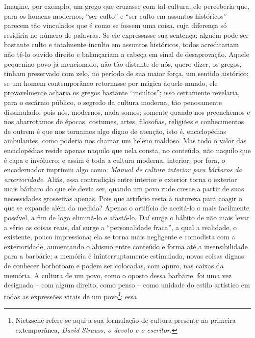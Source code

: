     Imagine, por exemplo, um grego que cruzasse com tal cultura; ele
    perceberia que, para os homens modernos, ``ser culto'' e ``ser culto
    em assuntos históricos'' parecem tão vinculados que é como se fossem
    uma coisa, cuja diferença só residiria no número de palavras. Se ele
    expressasse sua sentença: alguém pode ser bastante culto e
    totalmente inculto em assuntos históricos, todos acreditariam não
    tê-lo ouvido direito e balançariam a cabeça em sinal de
    desaprovação. Aquele pequenino povo já mencionado, não tão distante
    de nós, quero dizer, os gregos, tinham preservado com zelo, no
    período de sua maior força, um sentido aistórico; se um homem
    contemporâneo retornasse por mágica àquele mundo, ele provavelmente
    acharia os gregos bastante ``incultos''; isso certamente revelaria,
    para o escárnio público, o segredo da cultura moderna, tão
    penosamente dissimulado; pois nós, modernos, nada somos; somente
    quando nos preenchemos e nos abarrotamos de épocas, costumes, artes,
    filosofias, religiões e conhecimentos de outrem é que nos tornamos
    algo digno de atenção, isto é, enciclopédias ambulantes, como
    poderia nos chamar um heleno maldoso. Mas todo o valor das
    enciclopédias reside apenas naquilo que nela consta, no conteúdo,
    não naquilo que é capa e invólucro; e assim é toda a cultura
    moderna, interior; por fora, o encadernador imprimiu algo como:
    \emph{Manual de cultura interior para bárbaros da exterioridade}. Aliás,
    essa contradição entre interior e exterior torna o exterior mais
    bárbaro do que ele devia ser, quando um povo rude cresce a partir de
    suas necessidades grosseiras apenas. Pois que artifício resta à
    natureza para coagir o que se expande além da medida? Apenas o
    artifício de aceitá-lo o mais facilmente possível, a fim de logo
    eliminá-lo e afastá-lo. Daí surge o hábito de não mais levar a sério
    as coisas reais, daí surge a ``personalidade fraca'', a qual a
    realidade, o existente, pouco impressiona; ela se torna mais
    negligente e comodista com a exterioridade, aumentando o abismo
    entre conteúdo e forma até a insensibilidade para a barbárie; a
    memória é ininterruptamente estimulada, novas coisas dignas de
    conhecer borbotoam e podem ser colocadas, com apuro, nas caixas da
    memória. A cultura de um povo, como o oposto dessa barbárie, foi uma
    vez designada -- com algum direito, como penso -- como unidade do
    estilo artístico em todas as expressões vitais de um povo\footnote{Nietz\-sche
      refere-se aqui a sua formulação de cultura presente na primeira
      extemporânea, \emph{David Strauss, o devoto e o escritor}.};\label{vitaisdeumpovo} essa
